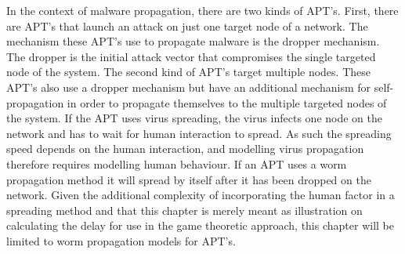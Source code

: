 In the context of malware propagation, there are two kinds of APT's. First, there are APT's that launch an attack on just one target node of a network. The mechanism these APT's use to propagate malware is the dropper mechanism. The dropper is the initial attack vector that compromises the single targeted node of the system. The second kind of APT's target multiple nodes. These APT's also use a dropper mechanism but have an additional mechanism for self-propagation in order to propagate themselves to the multiple targeted nodes of the system. If the APT uses virus spreading, the virus infects one node on the network and has to wait for human interaction to spread. As such the spreading speed depends on the human interaction, and modelling virus propagation therefore requires modelling human behaviour. If an APT uses a worm propagation method it will spread by itself after it has been dropped on the network. Given the additional complexity of incorporating the human factor in a spreading method and that this chapter is merely meant as illustration on calculating the delay for use in the game theoretic approach, this chapter will be limited to worm propagation models for APT's. \\

